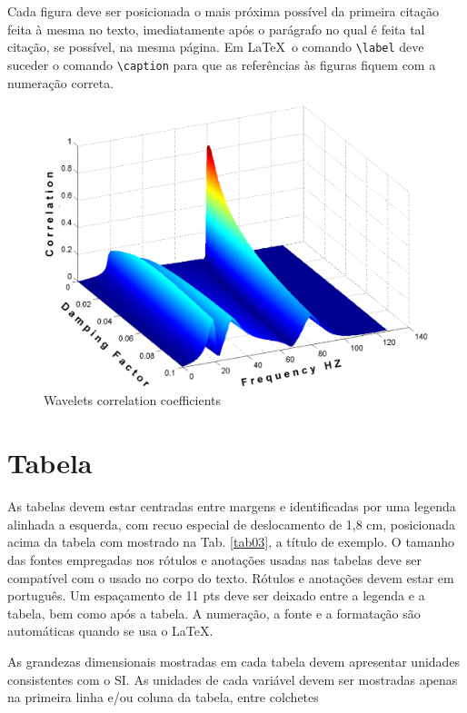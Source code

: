 Cada figura deve ser posicionada o mais próxima possível da primeira citação 
feita à mesma no texto, imediatamente após o parágrafo no qual é feita tal 
citação, se possível, na mesma página. Em \LaTeX\, o comando \texttt{\textbackslash label} deve suceder o comando \texttt{\textbackslash caption} para que as referências às figuras fiquem com a numeração correta.
\begin{figure}[h]
	\centering
	\includegraphics[keepaspectratio=true,scale=0.3]{figuras/fig01.eps}
	\caption{Wavelets correlation coefficients}
	\label{fig01}
\end{figure}

\section{Tabela}

As tabelas devem estar centradas entre margens e identificadas por uma legenda 
alinhada a esquerda, com recuo especial de deslocamento de 1,8 cm, posicionada 
acima da tabela com mostrado na Tab. \ref{tab03}, a título de 
exemplo. O tamanho das fontes empregadas nos rótulos e anotações usadas nas 
tabelas deve ser compatível com o usado no corpo do texto. Rótulos e anotações 
devem estar em português. Um espaçamento de 11 pts deve ser deixado entre a 
legenda e a tabela, bem como após a tabela. A numeração, a fonte e a formatação
são automáticas quando se usa o \LaTeX.

As grandezas dimensionais mostradas em cada tabela devem apresentar unidades 
consistentes com o SI. As unidades de cada variável devem ser mostradas apenas 
na primeira linha e/ou coluna da tabela, entre colchetes 

